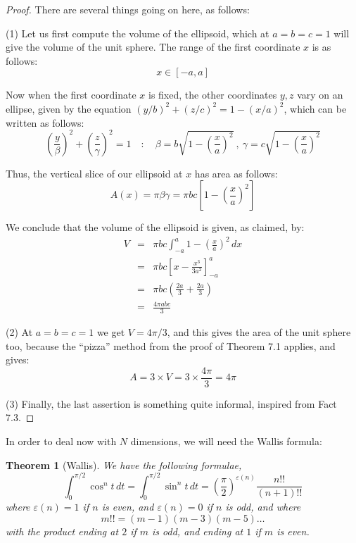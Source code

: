 \documentclass[12pt]{amsbook}
\newtheorem{theorem}{Theorem}[chapter]
\begin{document}
\begin{proof}
There are several things going on here, as follows:

\medskip

(1) Let us first compute the volume of the ellipsoid, which at $a=b=c=1$ will give the volume of the unit sphere. The range of the first coordinate $x$ is as follows:
$$x\in[-a,a]$$

Now when the first coordinate $x$ is fixed, the other coordinates $y,z$ vary on an ellipse, given by the equation $(y/b)^2+(z/c)^2=1-(x/a)^2$, which can be written as follows:
$$\left(\frac{y}{\beta}\right)^2+\left(\frac{z}{\gamma}\right)^2=1\quad:
\quad \beta=b\sqrt{1-\left(\frac{x}{a}\right)^2}\ ,\ \gamma=c\sqrt{1-\left(\frac{x}{a}\right)^2}$$

Thus, the vertical slice of our ellipsoid at $x$ has area as follows:
$$A(x)=\pi\beta\gamma=\pi bc\left[1-\left(\frac{x}{a}\right)^2\right]$$

We conclude that the volume of the ellipsoid is given, as claimed, by:
\begin{eqnarray*}
V
&=&\pi bc\int_{-a}^a1-\left(\frac{x}{a}\right)^2\,dx\\
&=&\pi bc\left[x-\frac{x^3}{3a^2}\right]_{-a}^a\\
&=&\pi bc\left(\frac{2a}{3}+\frac{2a}{3}\right)\\
&=&\frac{4\pi abc}{3}
\end{eqnarray*}

(2) At $a=b=c=1$ we get $V=4\pi/3$, and this gives the area of the unit sphere too, because the ``pizza'' method from the proof of Theorem 7.1 applies, and gives:
$$A=3\times V=3\times\frac{4\pi}{3}=4\pi$$

(3) Finally, the last assertion is something quite informal, inspired from Fact 7.3.
\end{proof}

In order to deal now with $N$ dimensions, we will need the Wallis formula:


\begin{theorem}[Wallis]
We have the following formulae,
$$\int_0^{\pi/2}\cos^nt\,dt=\int_0^{\pi/2}\sin^nt\,dt=\left(\frac{\pi}{2}\right)^{\varepsilon(n)}\frac{n!!}{(n+1)!!}$$
where $\varepsilon(n)=1$ if $n$ is even, and $\varepsilon(n)=0$ if $n$ is odd, and where
$$m!!=(m-1)(m-3)(m-5)\ldots$$
with the product ending at $2$ if $m$ is odd, and ending at $1$ if $m$ is even.
\end{theorem}
\end{document}
